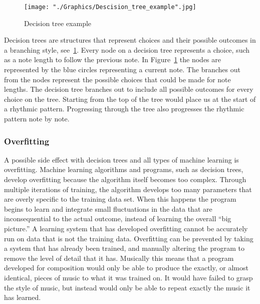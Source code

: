 \documentclass{sig-alternate}
\begin{document}
\begin{figure}[p]
	\texttt{[image: "./Graphics/Descision\_tree\_example".jpg]}
	\caption{Decision tree example}
	\label{fig:decisiontree}
\end{figure}

Decision trees are structures that represent choices and their possible outcomes in a branching style, see~\ref{fig:decisiontree}. Every node on a decision tree represents a choice, such as a note length to follow the previous note. In Figure~\ref{fig:decisiontree} the nodes are represented by the blue circles representing a current note. The branches out from the nodes represent the possible choices that could be made for note lengths. The decision tree branches out to include all possible outcomes for every choice on the tree.  Starting from the top of the tree would place us at the start of a rhythmic pattern. Progressing through the tree also progresses the rhythmic pattern note by note. 



\subsubsection{Overfitting}
\label{sec:overfitting}
A possible side effect with decision trees and all types of machine learning is overfitting. Machine learning algorithms and programs, such as decision trees, develop overfitting because the algorithm itself becomes too complex. Through multiple iterations of training, the algorithm develops too many parameters that are overly specific to the training data set. When this happens the program begins to learn and integrate small fluctuations in the data that are inconsequential to the actual outcome, instead of learning the overall ``big picture.'' A learning system that has developed overfitting cannot be accurately run on data that is not the training data. Overfitting can be prevented by taking a system that has already been trained, and manually altering the program to remove the level of detail that it has. Musically this means that a program developed for composition would only be able to produce the exactly, or almost identical, pieces of music to what it was trained on. It would have failed to grasp the style of music, but instead would only be able to repeat exactly the music it has learned.
\end{document}
